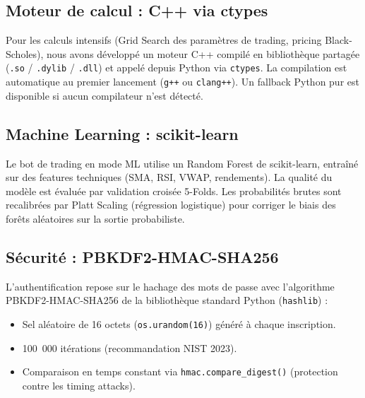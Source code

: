 \documentclass[a4paper, 12pt, twoside]{article}
\begin{document}
\subsection{Moteur de calcul : C++ via ctypes}

Pour les calculs intensifs (Grid Search des paramètres de trading,
pricing Black-Scholes), nous avons développé un moteur C++ compilé en
bibliothèque partagée (\texttt{.so} / \texttt{.dylib} / \texttt{.dll})
et appelé depuis Python via \texttt{ctypes}. La compilation est
automatique au premier lancement (\texttt{g++} ou \texttt{clang++}).
Un fallback Python pur est disponible si aucun compilateur n'est détecté.

\subsection{Machine Learning : scikit-learn}

Le bot de trading en mode ML utilise un Random Forest de scikit-learn,
entraîné sur des features techniques (SMA, RSI, VWAP, rendements). La
qualité du modèle est évaluée par validation croisée 5-Folds. Les
probabilités brutes sont recalibrées par Platt Scaling (régression
logistique) pour corriger le biais des forêts aléatoires sur la sortie
probabiliste.

\subsection{Sécurité : PBKDF2-HMAC-SHA256}

L'authentification repose sur le hachage des mots de passe avec
l'algorithme PBKDF2-HMAC-SHA256 de la bibliothèque standard Python
(\texttt{hashlib}) :

\begin{itemize}
    \item Sel aléatoire de 16 octets (\texttt{os.urandom(16)}) généré à
          chaque inscription.
    \item 100~000 itérations (recommandation NIST 2023).
    \item Comparaison en temps constant via \texttt{hmac.compare\_digest()}
          (protection contre les timing attacks).
\end{itemize}
\end{document}
